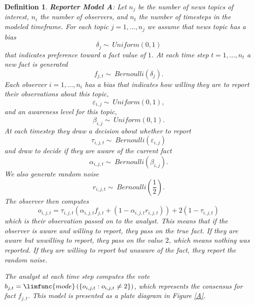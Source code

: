 \documentclass{amsart}
\theoremstyle{plain}
\newtheorem{definition}{Definition}
\numberwithin{equation}{section}
\begin{document}
\begin{definition}
\label{d1}\textbf{Reporter Model A}: Let $n_{j}$ be the number of news
topics of interest, $n_{i}$ the number of observers, and $n_{t}$ the number
of timesteps in the modeled timeframe. For each topic $j=1,\dots ,n_{j}$ we
assume that news topic has a bias 
\begin{equation*}
\delta _{j}\sim ~Uniform\left( 0,1\right) 
\end{equation*}%
that indicates preference toward a fact value of $1$. At each time step $%
t=1,\dots ,n_{t}$ a new fact is generated%
\begin{equation*}
f_{j,t}\sim ~Bernoulli\left( \delta _{j}\right) .
\end{equation*}%
Each observer $i=1,\dots ,n_{i}$ has a bias that indicates how willing they
are to report their observations about this topic,%
\begin{equation*}
\varepsilon _{i,j}\sim ~Uniform\left( 0,1\right) ,
\end{equation*}%
and an awareness level for this topic,%
\begin{equation*}
\beta _{i,j}\sim ~Uniform\left( 0,1\right) .
\end{equation*}%
At each timestep they draw a decision about whether to report%
\begin{equation*}
\tau _{i,j,t}\sim ~Bernoulli\left( \varepsilon _{i,j}\right) 
\end{equation*}%
and draw to decide if they are aware of the current fact%
\begin{equation*}
\alpha _{i,j,t}\sim ~Bernoulli\left( \beta _{i,j}\right) .
\end{equation*}%
We also generate random noise 
\begin{equation*}
r_{i,j,t}\sim ~Bernoulli\left( \frac{1}{2}\right) .
\end{equation*}%
The observer then computes%
\begin{equation*}
o_{i,j,t}=\tau _{i,j,t}\left( \alpha _{i,j,t}f_{j,t}+\left( 1-\alpha
_{i,j,t}r_{i,j,t}\right) \right) +2\left( 1-\tau _{i,j,t}\right) 
\end{equation*}%
which is their observation passed on to the analyst. This means that if the
observer is aware and willing to report, they pass on the true fact. If they
are aware but unwilling to report, they pass on the value $2$, which means
nothing was reported. If they are willing to report but unaware of the fact,
they report the random noise.

The analyst at each time step computes the vote $b_{j,t}=\limfunc{mode}%
\left( \left\{ o_{i,j,t}:o_{i,j,t}\neq 2\right\} \right) $, which represents
the consensus for fact $f_{j,t}$. This model is presented as a plate diagram
in Figure \ref{A}.
\end{definition}
\end{document}
